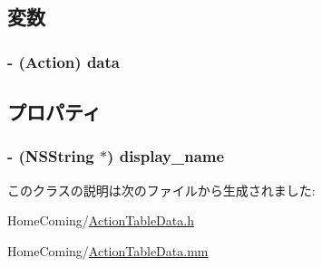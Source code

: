 \subsection{変数}
\hypertarget{interface_action_table_data_a4a22ecbb5de07c836bb62477f57d75b9}{
\subsubsection[{data}]{\setlength{\rightskip}{0pt plus 5cm}-\/ ({\bf Action}) {\bf data}}}\label{interface_action_table_data_a4a22ecbb5de07c836bb62477f57d75b9}


\subsection{プロパティ}
\hypertarget{interface_action_table_data_aaa560d71b399dfce0895a829151a02fb}{
\subsubsection[{display\-\_\-name}]{\setlength{\rightskip}{0pt plus 5cm}-\/ (N\-S\-String $\ast$) {\bf display\-\_\-name}}}\label{interface_action_table_data_aaa560d71b399dfce0895a829151a02fb}


このクラスの説明は次のファイルから生成されました\-:\begin{DoxyCompactItemize}
\item 
Home\-Coming/\hyperlink{_action_table_data_8h}{Action\-Table\-Data.\-h}\item 
Home\-Coming/\hyperlink{_action_table_data_8mm}{Action\-Table\-Data.\-mm}\end{DoxyCompactItemize}
